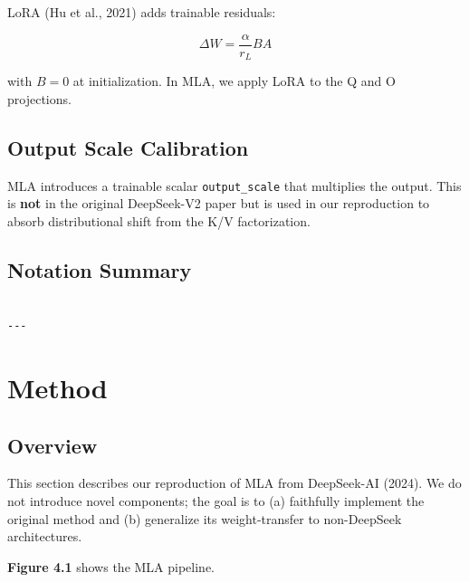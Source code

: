 LoRA (Hu et al., 2021) adds trainable residuals:

\[
\Delta W = \frac{\alpha}{r_L} B A
\tag{3.11}
\]

with $B = 0$ at initialization. In MLA, we apply LoRA to the Q and O 
projections.

\subsection{Output Scale Calibration}

MLA introduces a trainable scalar \texttt{output\_scale} that multiplies the 
output. This is \textbf{not} in the original DeepSeek-V2 paper but is used in 
our reproduction to absorb distributional shift from the K/V factorization.

\subsection{Notation Summary}

\begin{lstlisting}

---
\end{lstlisting}


\section{Method}

\subsection{Overview}

This section describes our reproduction of MLA from DeepSeek-AI (2024). We 
do not introduce novel components; the goal is to (a) faithfully implement 
the original method and (b) generalize its weight-transfer to 
non-DeepSeek architectures.

\textbf{Figure 4.1} shows the MLA pipeline.

